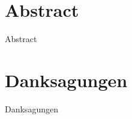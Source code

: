 \documentclass[oneside,12pt,a4paper]{report}
\begin{document}
\section*{Abstract}

Abstract
\newpage

\section*{Danksagungen}

Danksagungen

\cleardoublepage


\renewcommand{\baselinestretch}{1.3}
\small\normalsize

\tableofcontents

\renewcommand{\baselinestretch}{1}
\small\normalsize

\cleardoublepage


\setcounter{page}{1}


\cleardoublepage


\cleardoublepage


\cleardoublepage


\cleardoublepage






\end{document}
